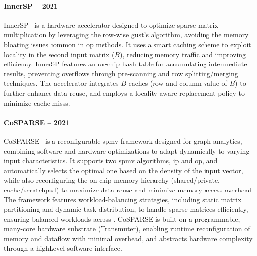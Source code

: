 \paragraph{InnerSP -- 2021}

InnerSP~\cite{Baek2021_InnerSP} is a hardware accelerator designed to optimize sparse matrix multiplication by leveraging the row-wise \acrlong{gust}'s algorithm, avoiding the memory bloating issues common in \acrlong{op} methods.
It uses a smart caching scheme to exploit locality in the second input matrix ($B$), reducing memory traffic and improving efficiency.
InnerSP features an on-chip hash table for accumulating intermediate results, preventing overflows through pre-scanning and row splitting/merging techniques.
The accelerator integrates $B$-caches (row and column-value of $B$) to further enhance data reuse, and employs a locality-aware replacement policy to minimize cache \glspl{miss}.

\paragraph{CoSPARSE -- 2021}

CoSPARSE~\cite{Feng2021_CoSPARSE} is a reconfigurable \acrshort{spmv} framework designed for graph analytics, combining software and hardware optimizations to adapt dynamically to varying input characteristics.
It supports two \acrshort{spmv} algorithms, \acrlong{ip} and \acrlong{op}, and automatically selects the optimal one based on the density of the input vector, while also reconfiguring the on-chip memory hierarchy (shared/private, cache/scratchpad) to maximize data reuse and minimize memory access overhead.
The framework features workload-balancing strategies, including static matrix partitioning and dynamic task distribution, to handle sparse matrices efficiently, ensuring balanced workloads across .
CoSPARSE is built on a programmable, many-core hardware substrate (Transmuter), enabling runtime reconfiguration of memory and dataflow with minimal overhead, and abstracts hardware complexity through a \gls{highLevel} software interface.

